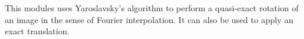 This modules uses Yaroslavsky's algorithm to perform a quasi-exact
rotation of an image in the sense of Fourier interpolation. 
It can also be used to 
apply an exact translation.